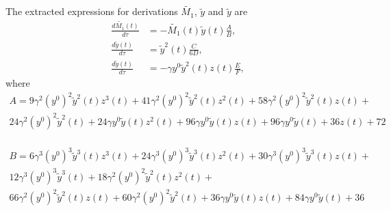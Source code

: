 \documentclass[12pt, letterpaper]{article}
\begin{document}
\noindent The extracted expressions for derivations $\tilde{M_1}$, $\tilde{y}$ and $\tilde{y}$ are
\begin{equation} \label{eq:final_system}
	\begin{aligned}
\frac{d \tilde{M_1}(t)}{d \tau} &= - \tilde{M_1}(t) \tilde{y}(t) \frac{A}{B}, \\
\frac{d \tilde{y}(t)}{d \tau} &= \tilde{y}^{2}{\left(t \right)} \frac{C}{6 D}, \\
\frac{d \tilde{y}(t)}{d \tau} &= - \gamma y^{0} \tilde{y}^{2}(t) z(t) \frac{E}{F},
	\end{aligned}
\end{equation}
where
\begin{equation}
	\begin{aligned}
		A = 9 \gamma^{2} \left(y^{0}\right)^{2} \tilde{y}^{2}{\left(t \right)} z^{3}{\left(t \right)} + 41 \gamma^{2} \left(y^{0}\right)^{2} \tilde{y}^{2}{\left(t \right)} z^{2}{\left(t \right)} + 58 \gamma^{2} \left(y^{0}\right)^{2} \tilde{y}^{2}{\left(t \right)} z{\left(t \right)} + \\
		24 \gamma^{2} \left(y^{0}\right)^{2} \tilde{y}^{2}{\left(t \right)} + 24 \gamma y^{0} \tilde{y}{\left(t \right)} z^{2}{\left(t \right)} + 96 \gamma y^{0} \tilde{y}{\left(t \right)} z{\left(t \right)} + 96 \gamma y^{0} \tilde{y}{\left(t \right)} + 36 z{\left(t \right)} + 72 \\
	\end{aligned}
\end{equation}

\begin{equation}
	\begin{aligned}
		B = 6 \gamma^{3} \left(y^{0}\right)^{3} \tilde{y}^{3}{\left(t \right)} z^{3}{\left(t \right)} + 24 \gamma^{3} \left(y^{0}\right)^{3} \tilde{y}^{3}{\left(t \right)} z^{2}{\left(t \right)} + 30 \gamma^{3} \left(y^{0}\right)^{3} \tilde{y}^{3}{\left(t \right)} z{\left(t \right)} + \\
		12 \gamma^{3} \left(y^{0}\right)^{3} \tilde{y}^{3}{\left(t \right)} + 18 \gamma^{2} \left(y^{0}\right)^{2} \tilde{y}^{2}{\left(t \right)} z^{2}{\left(t \right)} + \\
		66 \gamma^{2} \left(y^{0}\right)^{2} \tilde{y}^{2}{\left(t \right)} z{\left(t \right)} + 60 \gamma^{2} \left(y^{0}\right)^{2} \tilde{y}^{2}{\left(t \right)} + 36 \gamma y^{0} \tilde{y}{\left(t \right)} z{\left(t \right)} + 84 \gamma y^{0} \tilde{y}{\left(t \right)} + 36
	\end{aligned}
\end{equation}
\end{document}
